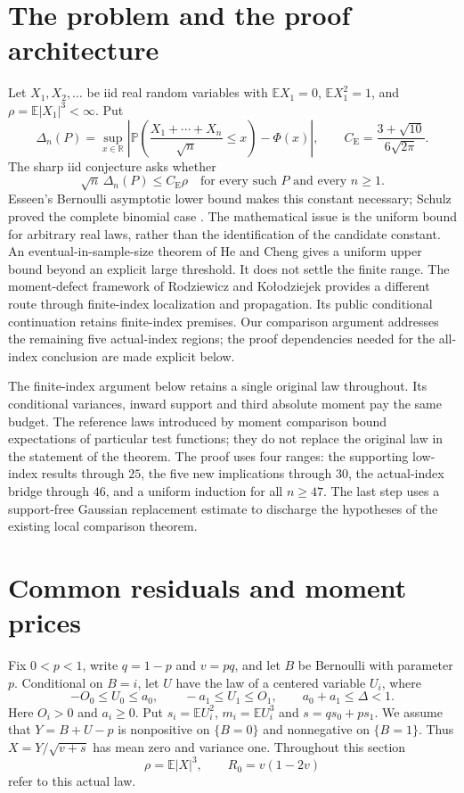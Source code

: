 \documentclass[aop,preprint]{imsart}
\theoremstyle{definition}
\newcommand{\CE}{C_{\mathrm E}}
\newcommand{\E}{\mathbb E}
\newcommand{\PP}{\mathbb P}
\numberwithin{equation}{section}
\begin{document}
\section{The problem and the proof architecture}
Let \(X_1,X_2,\ldots\) be iid real random variables with
\(\E X_1=0\), \(\E X_1^2=1\), and \(\rho=\E|X_1|^3<\infty\). Put
\[
 \Delta_n(P)=\sup_{x\in\mathbb R}
 \left|\PP\!\left(\frac{X_1+\cdots+X_n}{\sqrt n}\le x\right)-\Phi(x)\right|,
 \qquad
 \CE=\frac{3+\sqrt{10}}{6\sqrt{2\pi}}.
\]
The sharp iid conjecture asks whether
\[
 \sqrt n\,\Delta_n(P)\le\CE\rho
 \quad\text{for every such }P\text{ and every }n\ge1.
\]
Esseen's Bernoulli asymptotic lower bound makes this constant necessary;
Schulz proved the complete binomial case \cite{Schulz2016}.
The mathematical issue is the uniform bound for arbitrary real laws,
rather than the identification of the candidate constant.
An eventual-in-sample-size theorem of He and Cheng
\cite{HeCheng2026} gives a uniform upper bound beyond an explicit
large threshold. It does not settle the finite range.
The moment-defect framework of Rodziewicz and Ko\l{}odziejek
\cite{RK2026} provides a different route through finite-index
localization and propagation. Its public conditional continuation
retains finite-index premises. Our comparison argument addresses
the remaining five actual-index regions; the proof dependencies
needed for the all-index conclusion are made explicit below.

The finite-index argument below retains a single original law throughout.
Its conditional variances, inward support and third absolute moment pay
the same budget. The reference laws introduced by moment comparison
bound expectations of particular test functions; they do not replace
the original law in the statement of the theorem.
The proof uses four ranges: the supporting low-index results through
$25$, the five new implications through $30$, the actual-index bridge
through $46$, and a uniform induction for all $n\ge47$.
The last step uses a support-free Gaussian replacement estimate to
discharge the hypotheses of the existing local comparison theorem.

\section{Common residuals and moment prices}\label{mc:section}

Fix $0<p<1$, write $q=1-p$ and $v=pq$, and let $B$ be
Bernoulli with parameter $p$. Conditional on $B=i$, let $U$ have
the law of a centered variable $U_i$, where
\begin{equation}\label{mc:support}
 -O_0\le U_0\le a_0,\qquad -a_1\le U_1\le O_1,
 \qquad a_0+a_1\le\Delta<1.
\end{equation}
Here $O_i>0$ and $a_i\ge0$. Put $s_i=\E U_i^2$,
$m_i=\E U_i^3$ and $s=qs_0+ps_1$. We assume that
$Y=B+U-p$ is nonpositive on $\{B=0\}$ and nonnegative on
$\{B=1\}$. Thus $X=Y/\sqrt{v+s}$ has mean zero and variance one.
Throughout this section
\[
 \rho=\E|X|^3,\qquad R_0=v(1-2v)
\]
refer to this actual law.
\end{document}
